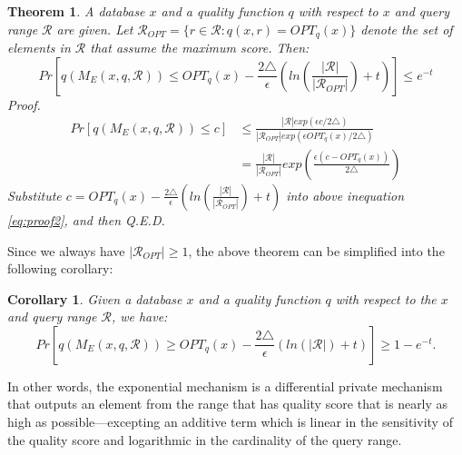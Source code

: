 \documentclass[a4paper, 11pt]{article} %
\newtheorem{theorem}{Theorem}
\newtheorem{corollary}{Corollary}[theorem]
\begin{document}
\begin{theorem}
A database $x$ and a quality function $q$ with respect to $x$ and query range $\mathcal{R}$ are given. Let $\mathcal{R}_{OPT} =\{r \in \mathcal{R}: q(x, r) = OPT_q(x) \}$ denote the set of elements in $\mathcal{R}$ that assume the maximum score. Then:
\begin{equation}
Pr \left[q(M_E(x, q, \mathcal{R}))  
\leq OPT_q(x) - \frac{2\triangle}{\epsilon} 
\left(   
ln \left( \frac{|\mathcal{R}|}{|\mathcal{R}_{OPT}|} \right) + t
\right) \right]
 \leq e^{-t}
\end{equation}
\textit{Proof. }
\begin{align}  \label{eq:proof2}
Pr[q(M_E(x, q, \mathcal{R})) \leq c] 
& \leq \frac{
|\mathcal{R}| exp(\epsilon c / 2 \triangle)
}{
|\mathcal{R}_{OPT}| exp(\epsilon OPT_q(x) / 2 \triangle)
} \\
&= \frac{|\mathcal{R}| }{ | \mathcal{R}_{OPT} | }
exp(
\frac{\epsilon ( c - OPT_q(x)  ) }{2 \triangle}
)
\end{align}
Substitute $c = OPT_q(x) - \frac{2\triangle}{\epsilon} 
\left(   
ln \left( \frac{|\mathcal{R}|}{|\mathcal{R}_{OPT}|} \right) + t
\right)
$ into above inequation \ref{eq:proof2}, and then Q.E.D.
\end{theorem}
Since we always have $|\mathcal{R}_{OPT}| \geq 1$, the above theorem can be simplified into the following corollary:
\begin{corollary}
Given a database $x$ and a quality function $q$ with respect to the $x$ and query range $\mathcal{R}$, we have:
\begin{equation}
Pr[q(M_E(x, q, \mathcal{R}))  \geq  
OPT_q(x) - \frac{2 \triangle}{\epsilon} (ln(| \mathcal{R}|) + t)]
\geq 1-e^{-t}.
\end{equation}
\end{corollary}
In other words, the exponential mechanism is a differential private mechanism that outputs an element from the range that has quality score that is nearly as high as possible---excepting an additive term which is linear in the sensitivity of the quality score and logarithmic in the cardinality of the query range.
\end{document}
